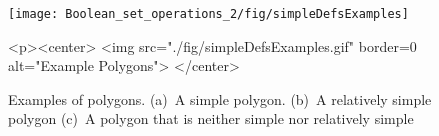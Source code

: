 \begin{figure}[!htp]
\begin{center}
\begin{ccTexOnly}
  \begin{center}
  \texttt{[image: Boolean\_set\_operations\_2/fig/simpleDefsExamples]}
  \end{center}
\end{ccTexOnly}
\label{fig:simpleDefsExamples}
\begin{ccHtmlOnly}
  <p><center>
    <img src="./fig/simpleDefsExamples.gif" border=0 alt="Example Polygons">
  </center>
\end{ccHtmlOnly}
\caption{Examples of polygons. (a)~A simple polygon. (b)~A relatively simple polygon (c)~A polygon that is neither simple nor relatively simple} 
\end{center}
\end{figure}
